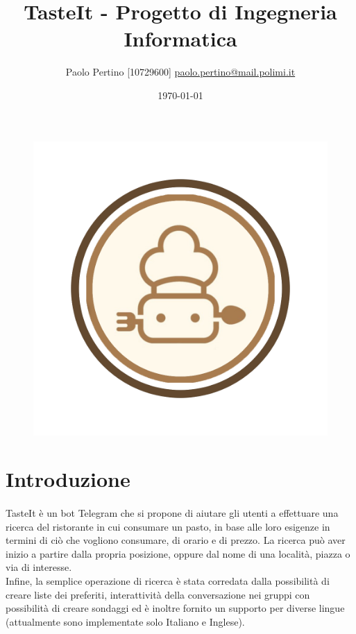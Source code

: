 \documentclass[a4paper, 12pt]{article}
\title{TasteIt - Progetto di Ingegneria Informatica}
\author{
	Paolo Pertino [10729600]
	\href{mailto:paolo.pertino@mail.polimi.it}{paolo.pertino@mail.polimi.it} \\
}
\begin{document}
	\date{\today}
	\maketitle
	
	\begin{figure}[h!]
		\centering
		\includegraphics[scale=0.35]{tasteitIntro.png}
	\end{figure}

	\newpage
	
	\tableofcontents
	
	\newpage
	
	\section{Introduzione}
	\paragraph{}
	TasteIt è un bot Telegram che si propone di aiutare gli utenti a effettuare una ricerca del ristorante in cui consumare un pasto, in base alle loro esigenze in termini di ciò che vogliono consumare, di orario e di prezzo. La ricerca può aver inizio a partire dalla propria posizione, oppure dal nome di una località, piazza o via di interesse.\\
	Infine, la semplice operazione di ricerca è stata corredata dalla possibilità di creare liste dei preferiti, interattività della conversazione nei gruppi con possibilità di creare sondaggi ed è inoltre fornito un supporto per diverse lingue (attualmente sono implementate solo Italiano e Inglese).
	
\end{document}
